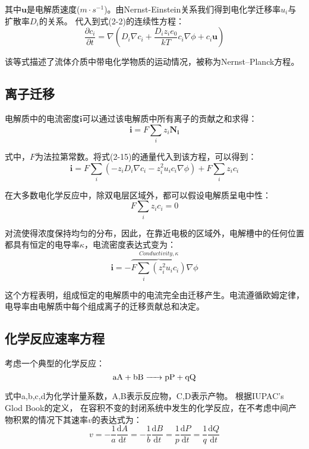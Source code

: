 其中$\mathbf{u}$是电解质速度($m\cdot{s^{-1}}$)。由Nernst-Einstein关系我们得到电化学迁移率$u_i$与扩散率$D_i$的关系。
代入到式(2-2)的连续性方程：
\begin{equation}
    \frac{\partial c_i}{\partial t}=\nabla{(D_i\nabla{c_i}+\frac{D_iz_ie_0}{kT}c_i\nabla\phi+c_i\mathbf{u})}
    \label{equation:Nernst_Planck}
\end{equation}

该等式描述了流体介质中带电化学物质的运动情况，被称为Nernst–Planck方程\cite{Mehrer2007}。
\subsection{离子迁移}
电解质中的电流密度$\mathbf{i}$可以通过该电解质中所有离子的贡献之和求得：
\begin{equation}
    \mathbf{i}=F\sum_i{z_i\mathbf{N_i}}
\end{equation}

式中，$F$为法拉第常数。将式(2-15)的通量代入到该方程，可以得到：
\begin{equation}
    \mathbf{i}=F\sum_i(-z_iD_i\nabla{c_i}-z_i^2u_ic_i\nabla\phi)+F\sum_iz_ic_i
\end{equation}

在大多数电化学反应中，除双电层区域外，都可以假设电解质呈电中性：
\begin{equation}
    F\sum_iz_ic_i=0
    \label{equation:neutrality}
\end{equation}

对流使得浓度保持均匀的分布，因此，在靠近电极的区域外，电解槽中的任何位置都具有恒定的电导率$\kappa$，电流密度表达式变为：
\begin{equation}
    \mathbf{i}=-\overbrace{F\sum_i(z_i^2u_ic_i)}^{Conductivity,\kappa}\nabla\phi
\end{equation}

这个方程表明，组成恒定的电解质中的电流完全由迁移产生。电流遵循欧姆定律，电导率由电解质中每个组成离子的迁移贡献总和决定\cite{Smedley1980}。

\subsection{化学反应速率方程}
考虑一个典型的化学反应：
\begin{equation}
    \ce{aA + bB -> pP + qQ}
\end{equation}

式中a,b,c,d为化学计量系数，A,B表示反应物，C,D表示产物。
根据IUPAC's Glod Book的定义\cite{GlossaryoftermsusedinphysicalorganicchemistryIUPACRecommendations1994}，
在容积不变的封闭系统中发生的化学反应，在不考虑中间产物积累的情况下其速率$v$的表达式为：
\begin{equation}
    v=-\frac{1}{a}\frac{\mathrm{d}A}{\mathrm{d}t}
    =-\frac{1}{b}\frac{\mathrm{d}B}{\mathrm{d}t}
    =\frac{1}{p}\frac{\mathrm{d}P}{\mathrm{d}t}
    =\frac{1}{q}\frac{\mathrm{d}Q}{\mathrm{d}t}
\end{equation}

